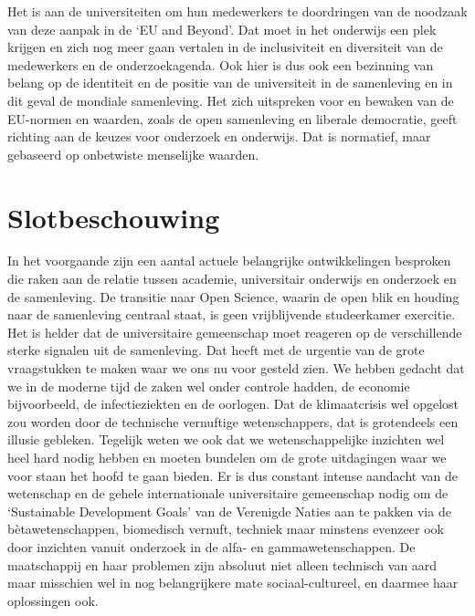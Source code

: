 \documentclass[empirical, authordate, ]{new-jote-article}
\begin{document}
	Het is aan de universiteiten om hun medewerkers te doordringen van de noodzaak van deze aanpak in de ‘EU and Beyond'. Dat moet in het onderwijs een plek krijgen en zich nog meer gaan vertalen in de inclusiviteit en diversiteit van de medewerkers en de onderzoekagenda. Ook hier is dus ook een bezinning van belang op de identiteit en de positie van de universiteit in de samenleving en in dit geval de mondiale samenleving. Het zich uitspreken voor en bewaken van de EU-normen en waarden, zoals de open samenleving en liberale democratie, geeft richting aan de keuzes voor onderzoek en onderwijs. Dat is normatief, maar gebaseerd op onbetwiste menselijke waarden.



	\section{Slotbeschouwing}



	In het voorgaande zijn een aantal actuele belangrijke ontwikkelingen besproken die raken aan de relatie tussen academie, universitair onderwijs en onderzoek en de samenleving. De transitie naar Open Science, waarin de open blik en houding naar de samenleving centraal staat, is geen vrijblijvende studeerkamer exercitie. Het is helder dat de universitaire gemeenschap moet reageren op de verschillende sterke signalen uit de samenleving. Dat heeft met de urgentie van de grote vraagstukken te maken waar we ons nu voor gesteld zien. We hebben gedacht dat we in de moderne tijd de zaken wel onder controle hadden, de economie bijvoorbeeld, de infectieziekten en de oorlogen. Dat de klimaatcrisis wel opgelost zou worden door de technische vernuftige wetenschappers, dat is grotendeels een illusie gebleken. Tegelijk weten we ook dat we wetenschappelijke inzichten wel heel hard nodig hebben en moeten bundelen om de grote uitdagingen waar we voor staan het hoofd te gaan bieden. Er is dus constant intense aandacht van de wetenschap en de gehele internationale universitaire gemeenschap nodig om de ‘Sustainable Development Goals' van de Verenigde Naties aan te pakken via de bètawetenschappen, biomedisch vernuft, techniek maar minstens evenzeer ook door inzichten vanuit onderzoek in de alfa- en gammawetenschappen. De maatschappij en haar problemen zijn absoluut niet alleen technisch van aard maar misschien wel in nog belangrijkere mate sociaal-cultureel, en daarmee haar oplossingen ook.
\end{document}
